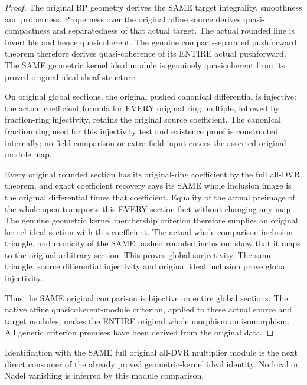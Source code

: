 \begin{proof}
The original BP geometry derives the SAME target integrality,
smoothness and properness. Properness over the original affine
source derives quasi-compactness and separatedness of that
actual target. The actual rounded line is invertible and hence
quasicoherent. The genuine compact-separated pushforward theorem
therefore derives quasi-coherence of its ENTIRE actual pushforward.
The SAME geometric kernel ideal module is genuinely quasicoherent
from its proved original ideal-sheaf structure.

On original global sections, the original pushed canonical
differential is injective: the actual coefficient formula for
EVERY original ring multiple, followed by fraction-ring
injectivity, retains the original source coefficient. The
canonical fraction ring used for this injectivity test and
existence proof is constructed internally; no field comparison
or extra field input enters the asserted original module map.

Every original rounded section has its original-ring coefficient
by the full all-DVR theorem, and exact coefficient recovery says
its SAME whole inclusion image is the original differential
times that coefficient. Equality of the actual preimage of the
whole open transports this EVERY-section fact without changing
any map. The genuine geometric kernel membership criterion
therefore supplies an original kernel-ideal section with this
coefficient. The actual whole comparison inclusion triangle,
and monicity of the SAME pushed rounded inclusion, show that
it maps to the original arbitrary section. This proves global
surjectivity. The same triangle, source differential injectivity
and original ideal inclusion prove global injectivity.

Thus the SAME original comparison is bijective on entire global
sections. The native affine quasicoherent-module criterion,
applied to these actual source and target modules, makes the
ENTIRE original whole morphism an isomorphism. All generic
criterion premises have been derived from the original data.
\end{proof}

Identification with the SAME full original all-DVR multiplier
module is the next direct consumer of the already proved
geometric-kernel ideal identity. No local or Nadel vanishing
is inferred by this module comparison.
